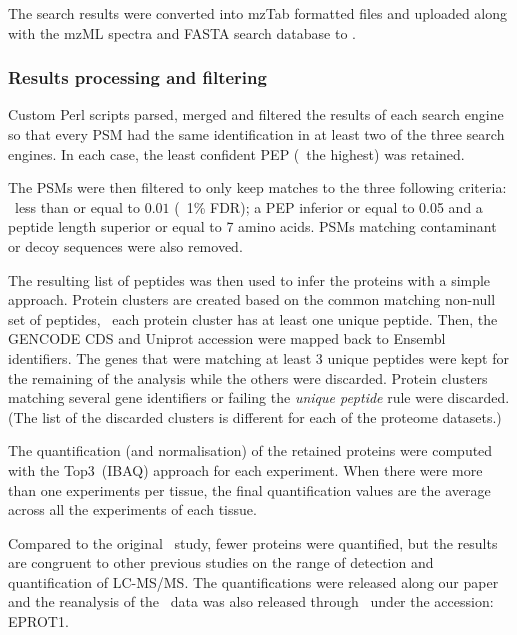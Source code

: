 The search results were converted into mzTab formatted files and uploaded along
with the mzML spectra and FASTA search database to .

\subsubsection{Results processing and filtering}\label{subsub:resultsFiltering}

Custom Perl scripts parsed, merged and filtered the results of each search engine
so that every \gls{PSM} had the same identification in at least two of the three
search engines.
In each case, the least confident \gls{PEP} (\ie\ the highest) was retained.

The \glspl{PSM} were then filtered to only keep matches to the three following
criteria:
\qval\ less than or equal to $0.01$ (\ie\ 1\% \gls{FDR});
a \gls{PEP} inferior or equal to 0.05 and
a peptide length superior or equal to 7 amino acids.
\glspl{PSM} matching contaminant or decoy sequences were also removed.

The resulting list of peptides was then used to infer the proteins with
a simple approach.
Protein clusters are created based on the common matching non-null set of peptides,
\ie\ each protein cluster has at least one unique peptide.
Then, the \gls{GENCODE} \gls{CDS} and \gls{Uniprot} accession were mapped back to
\gls{Ensembl} identifiers.
The genes that were matching at least 3 unique peptides were kept for the
remaining of the analysis while the others were discarded. Protein clusters
matching several gene identifiers or failing the \emph{unique peptide} rule were
discarded. (The list of the discarded clusters is different for each of the
proteome datasets.)

The quantification (and normalisation) of the retained proteins were computed
with the Top3~(\gls{IBAQ}) approach for each experiment.
When there were more than one experiments per tissue, the final quantification
values are the average across all the experiments of each tissue.

Compared to the original \pandey\ study, fewer proteins were quantified, but
the results are congruent to other previous studies on the range of detection
and quantification of \gls{LC-MS/MS}. The quantifications were released along
our paper~ and the reanalysis of the \pandey\ data was
also released through \egxa\ under the accession: E\textminus{}PROT\textminus{}1.

